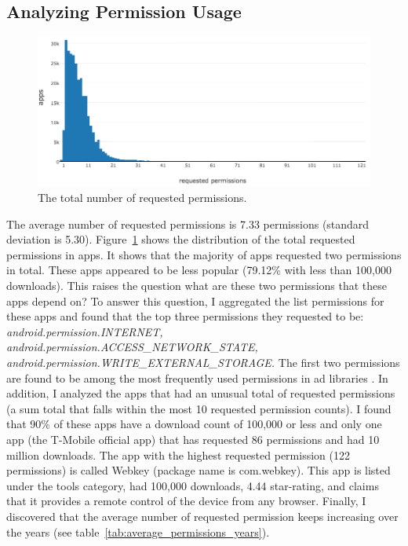 \subsection{Analyzing Permission Usage}
\begin{figure}[h]
	\includegraphics[scale=0.55]{figures/findings/total_permissions.png}
	\caption{The total number of requested permissions.}
	\label{fig:total_permissions}
\end{figure}
The average number of requested permissions is 7.33 permissions (standard deviation is 5.30).
Figure~\ref{fig:total_permissions} shows the distribution of the total requested permissions in apps.
It shows that the majority of apps requested two permissions in total.
These apps appeared to be less popular (79.12\% with less than 100,000 downloads).
This raises the question what are these two permissions that these apps depend on?
To answer this question, I aggregated the list permissions for these apps and found that the top three permissions they requested to be:
\textit{android.permission.INTERNET, android.permission.ACCESS\_NETWORK\_STATE, android.permission.WRITE\_EXTERNAL\_STORAGE.}
The first two permissions are found to be among the most frequently used permissions in ad libraries \cite{Liu_2015_MobiSys}.
In addition, I analyzed the apps that had an unusual total of requested permissions (a sum total that falls within the most 10 requested permission counts).
I found that 90\% of these apps have a download count of 100,000 or less and only one app (the T-Mobile official app) that has requested 86 permissions and had 10 million downloads.
The app with the highest requested permission (122 permissions) is called Webkey (package name is com.webkey).
This app is listed under the tools category, had 100,000 downloads, 4.44 star-rating, and claims that it provides a remote control of the device from any browser.
Finally, I discovered that the average number of requested permission keeps increasing over the years (see table~\ref{tab:average_permissions_years}).
